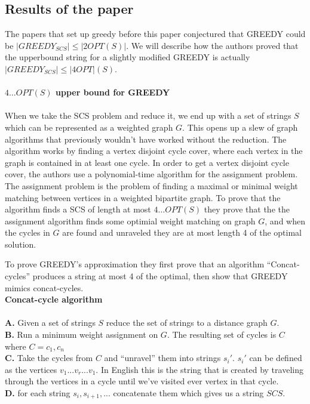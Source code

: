 \documentclass[letterpaper,11pt,titlepage]{article}
\begin{document}
\subsection*{Results of the paper}

The papers that set up greedy before this paper conjectured that GREEDY could be $ |GREEDY_{SCS}| \leq |2OPT(S)|$. We will describe how the authors proved that the upperbound string for a slightly modified GREEDY is actually $ |GREEDY_{SCS}| \leq |4OPT|(S)$.\\\\


\textbf{$4 \ldots OPT(S)$ upper bound for GREEDY}\\\\

When we take the SCS problem and reduce it, we end up with a set of strings $S$ which can be represented as a weighted graph $G$. This opens up a slew of graph algorithms that previously wouldn't have worked without the reduction. The algorithm works by finding a vertex disjoint cycle cover, where each vertex in the graph is contained in at least one cycle. In order to get a vertex disjoint cycle cover, the authors use a polynomial-time algorithm for the assignment problem. The assignment problem is the problem of finding a maximal or minimal weight matching between vertices in a weighted bipartite graph. To prove that the algorithm finds a SCS of length at most $4 \ldots OPT(S)$ they prove that the the assignment algorithm finds some optimial weight matching on graph $G$, and when the cycles in $G$ are found and unraveled they are at most length 4 of the optimal solution.

To prove GREEDY's approximation they first prove that an algorithm ``Concat-cycles'' produces a string at most 4 of the optimal, then show that GREEDY mimics concat-cycles.\\

\textbf{Concat-cycle algorithm}\\\\

\textbf{A.} Given a set of strings $S$ reduce the set of strings to a distance graph $G$. \\
\textbf{B.} Run a minimum weight assignment on $G$. The resulting set of cycles is $C$ where $C = {c_1, c_n}$\\
\textbf{C.} Take the cycles from $C$ and ``unravel'' them into strings $s_i'$. $s_i'$ can be defined as the vertices $v_1 ... v_r ... v_1$. In English this is the string that is created by traveling through the vertices in a cycle until we've visited ever vertex in that cycle.\\
\textbf{D.} for each string $s_i, s_{i+1}, ...$ concatenate them which gives us a string $SCS$.\\
\end{document}
